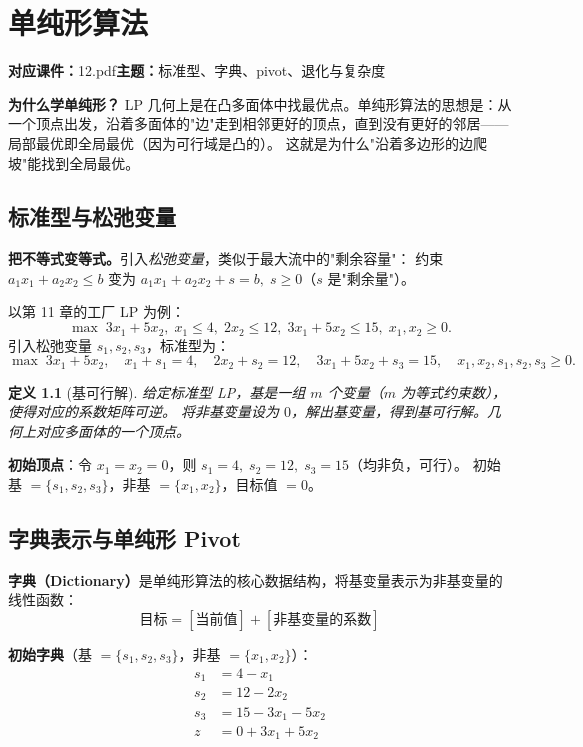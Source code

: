\documentclass[UTF8,openany,12pt]{ctexbook}
\newtheorem{definition}{定义}[chapter]
\theoremstyle{remark}
\newcommand{\lecture}[3]{
  \chapter{#2}
  \noindent\textbf{对应课件：}#1\hfill\textbf{主题：}#3
  \vspace{0.6em}
}
\begin{document}
\lecture{12.pdf}{单纯形算法}{标准型、字典、pivot、退化与复杂度}

\noindent
\textbf{为什么学单纯形？}
LP 几何上是在凸多面体中找最优点。单纯形算法的思想是：从一个顶点出发，沿着多面体的"边"走到相邻更好的顶点，直到没有更好的邻居——局部最优即全局最优（因为可行域是凸的）。
这就是为什么"沿着多边形的边爬坡"能找到全局最优。

\section{标准型与松弛变量}

\noindent\textbf{把不等式变等式。}引入\emph{松弛变量}，类似于最大流中的"剩余容量"：
约束 $a_1x_1+a_2x_2\le b$ 变为 $a_1x_1+a_2x_2+s=b,\;s\ge0$（$s$ 是"剩余量"）。

\noindent 以第 11 章的工厂 LP 为例：
\[
  \max\;3x_1+5x_2,\; x_1\le4,\; 2x_2\le12,\; 3x_1+5x_2\le15,\; x_1,x_2\ge0.
\]
引入松弛变量 $s_1,s_2,s_3$，标准型为：
\[
  \max\;3x_1+5x_2,\quad x_1+s_1=4,\quad 2x_2+s_2=12,\quad 3x_1+5x_2+s_3=15,\quad x_1,x_2,s_1,s_2,s_3\ge0.
\]

\begin{definition}[基可行解]
给定标准型 LP，\emph{基}是一组 $m$ 个变量（$m$ 为等式约束数），使得对应的系数矩阵可逆。
将非基变量设为 $0$，解出基变量，得到\emph{基可行解}。几何上对应多面体的一个顶点。
\end{definition}

\noindent\textbf{初始顶点}：令 $x_1=x_2=0$，则 $s_1=4,\;s_2=12,\;s_3=15$（均非负，可行）。
初始基 $=\{s_1,s_2,s_3\}$，非基 $=\{x_1,x_2\}$，目标值 $=0$。

\section{字典表示与单纯形 Pivot}

\noindent\textbf{字典（Dictionary）}是单纯形算法的核心数据结构，将基变量表示为非基变量的线性函数：
\[
  \text{目标} = [\text{当前值}] + [\text{非基变量的系数}]
\]

\noindent\textbf{初始字典}（基 $=\{s_1,s_2,s_3\}$，非基 $=\{x_1,x_2\}$）：
\begin{align*}
  s_1 &= 4 - x_1 \\
  s_2 &= 12 - 2x_2 \\
  s_3 &= 15 - 3x_1 - 5x_2 \\
  z   &= 0 + 3x_1 + 5x_2
\end{align*}
\end{document}

